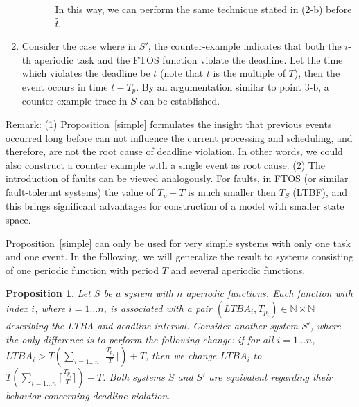 \documentclass[10pt, a4paper, onecolumn, conference, compsocconf]{IEEEtran}
\newtheorem{prop}{Proposition}
\begin{document}
\begin{IEEEproof}
\begin{enumerate}
\begin{enumerate}
\begin{enumerate}
                In this way, we can perform the same technique stated in (2-b) before $\hat{t}$.
            \end{enumerate}
          \end{enumerate}
    \item Consider the case where in $S'$, the counter-example indicates that both the $i$-th aperiodic task and the FTOS function violate the deadline.
          Let the time which violates the deadline be $t$ (note that $t$ is the multiple of $T$), then the event occurs in time $t-T_p$. By an argumentation similar to point 3-b, a counter-example trace in $S$ can be established.
\end{enumerate}

\end{IEEEproof}

Remark: (1) Proposition~\ref{simple} formulates the insight that previous events occurred long before can not influence the current processing and scheduling, and therefore, are not the root cause of deadline violation. In other words, we could also construct a counter example with a single event as root cause.
(2) The introduction of faults can be viewed analogously. For faults, in FTOS (or similar fault-tolerant systems) the value of $T_p + T$ is much smaller then $T_S$ (LTBF), and this brings
significant advantages for construction of a model with smaller state space.

Proposition~\ref{simple} can only be used for very simple systems with only one task and one event. In the following, we will generalize the result to systems consisting of one periodic function with period $T$ and several aperiodic functions.

\begin{prop}\label{more.events}
 Let $S$ be a system  with $n$ aperiodic functions. Each function with index $i$, where $i= 1\ldots n$, is associated with a pair
 $(LTBA_i, T_{p_i})\in \mathbb{N}\times\mathbb{N}$ describing the LTBA and deadline interval.
 Consider another system $S'$, where the only difference is to perform the following change: if for all $i= 1\ldots n$,
$LTBA_i > T(\sum_{i= 1 \ldots n}\lceil\frac{ T_{p_i}}{T}\rceil) + T$, then we change $LTBA_i$ to $T(\sum_{i= 1 \ldots
n}\lceil\frac{ T_{p_i}}{T}\rceil) + T$. Both systems $S$ and $S'$
are equivalent regarding their behavior concerning deadline
violation.
\end{prop}
\end{document}
